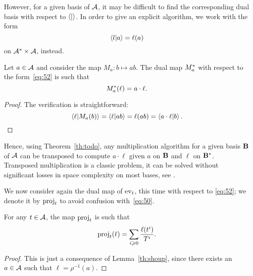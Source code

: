 However, for a given basis of $\mathcal{A}$, it may be difficult to find
the corresponding dual basis with respect to $\left\langle  \middle|  \right\rangle$. In order
to give an explicit algorithm, we work with the form
\begin{equation}
  \label{eq:52}
  \left\langle l \middle| a \right\rangle = \ell(a)
\end{equation}
on $\mathcal{A}^\ast\times\mathcal{A}$, instead.

\begin{lemma}
  Let $a\in\mathcal{A}$ and consider the map $M_a:b\mapsto ab$. The dual
  map $M_a^\ast$ with respect to the form~\eqref{eq:52} is
  such that
  \begin{equation}
    \label{eq:53}
    M_a^\ast(\ell) = a\cdot\ell
    \text{.}
  \end{equation}
\end{lemma}
\begin{proof}
  The verification is straightforward:
  \begin{equation}
    \label{eq:54}
    \left\langle \ell \middle| M_a(b) \right\rangle = \left\langle \ell \middle| ab \right\rangle = \ell(ab) =
    \left\langle a\cdot\ell \middle| b \right\rangle
    \text{.}
  \end{equation}
\end{proof}

Hence, using Theorem~\ref{th:todo}, any multiplication algorithm for a
given basis $\mathbf{B}$ of $\mathcal{A}$ can be transposed to compute
$a\cdot\ell$ given $a$ on $\mathbf{B}$ and $\ell$ on
$\mathbf{B}^\ast$. Transposed multiplication is a classic problem, it
can be solved without significant losses in space complexity on most
bases, see
\cite{shoup94,shoup95,shoup99,bostan+lecerf+schost:tellegen,hanrot+quercia+zimmermann}.

We now consider again the dual map of $\operatorname{ev}_t$, this time with respect
to \eqref{eq:52}; we denote it by $\operatorname{proj}_t$ to avoid confusion
with~\eqref{eq:50}.

\begin{lemma}
  \label{th:shoup94}
  For any $t\in\mathcal{A}$, the map $\operatorname{proj}_t$ is such that
  \begin{equation}
    \label{eq:55}
    \operatorname{proj}_t(\ell) = \sum_{i\geqslant0}\frac{\ell(t^i)}{T^{i}}
    \text{.}
  \end{equation}  
\end{lemma}
\begin{proof}
  This is just a consequence of Lemma~\ref{th:shoup}, since there
  exists an $a\in\mathcal{A}$ such that $\ell=\rho^{-1}(a)$.
\end{proof}

